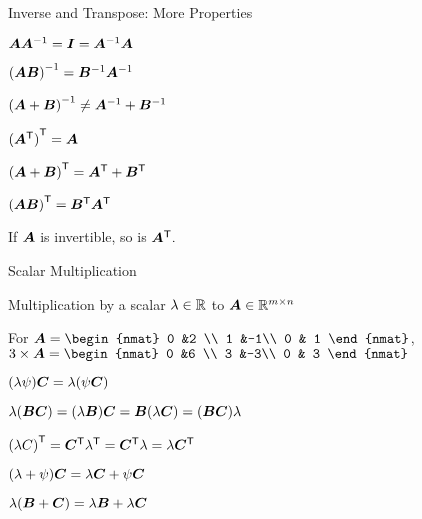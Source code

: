 \documentclass[fleqn,aspectratio=169]{beamer}
\begin{document}
\begin{frame}{Inverse and Transpose: More Properties}

\plitemsep 0.2in
\bci 
\item $\bm{A}{{\bm{A}}^{-1}} = \bm{I} = {{\bm{A}}^{-1}}\bm{A}$

\item ${{(\bm{AB})}^{-1}} = {{\bm{B}}^{-1}} {{\bm{A}}^{-1}}$

\item ${{(\bm{A} + \bm{B})}^{-1}} \neq {{\bm{A}}^{-1}} + {{\bm{B}}^{-1}}$

\item ${({\bm{A}}^{\mathsf{T}})}^{\mathsf{T}} = \bm{A}$  

\item ${(\bm{A} + \bm{B})}^{\mathsf{T}} = {\bm{A}}^{\mathsf{T}} + {\bm{B}}^{\mathsf{T}}$

\item ${(\bm{A}\bm{B})}^{\mathsf{T}} = {\bm{B}}^{\mathsf{T}}{\bm{A}}^{\mathsf{T}}$

\item If $\bm{A}$ is invertible, so is ${\bm{A}}^{\mathsf{T}}.$
\eci

\end{frame}

\begin{frame}{Scalar Multiplication}

\plitemsep 0.1in
\bci 
    \item Multiplication by a scalar $\lambda \in {\mathbb R}$ to $\bm{A} \in {\mathbb R}^{m \times n}$
    \item \exam For 
$\mat{A} = 
\begin{nmat} 
 0 &2 \\
 1  &-1\\
 0  & 1
\end{nmat}
$,
$
3 \times \mA = \begin{nmat} 
 0 &6 \\
 3  &-3\\
 0  & 3
\end{nmat}
$

\bigskip

\item {}
\bci
\item $(\lambda \psi) \bm{C} = \lambda (\psi \bm{C})$
\item $\lambda(\bm{B} \bm{C}) = (\lambda \bm{B}) \bm{C} = \bm{B} (\lambda \bm{C}) = (\bm{B} \bm{C}) \lambda$
\item ${(\lambda C)}^{\mathsf{T}} = {\bm{C}}^{\mathsf{T}} {\lambda}^{\mathsf{T}} = {\bm{C}}^{\mathsf{T}} \lambda = \lambda {\bm{C}}^{\mathsf{T}}$
\eci

\item {}
\bci
\item $(\lambda + \psi) \bm{C} = \lambda \bm{C} + \psi \bm{C}$
\item $\lambda(\bm{B} + \bm{C}) = \lambda \bm{B} + \lambda \bm{C}$
\eci


\eci

\end{frame}
\end{document}
